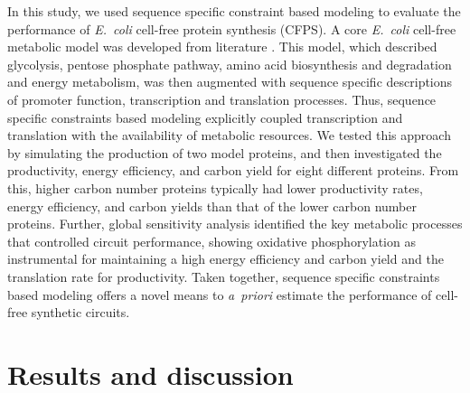 \documentclass[journal=asbcd6,manuscript=article]{achemso}
\begin{document}
In this study, we used sequence specific constraint based modeling to evaluate the performance of \emph{E.~coli} cell-free protein synthesis (CFPS).
A core \emph{E.~coli} cell-free metabolic model was developed from literature \cite{Feist:2007aa}.
This model, which described glycolysis, pentose phosphate pathway, amino acid biosynthesis and degradation and energy metabolism, was then augmented with
sequence specific descriptions of promoter function, transcription and translation processes.
Thus, sequence specific constraints based modeling explicitly coupled transcription and translation with the availability of metabolic resources.
We tested this approach by simulating the production of two model proteins, and then investigated the productivity, energy efficiency, and carbon yield for eight different proteins.
From this, higher carbon number proteins typically had lower productivity rates, energy efficiency, and carbon yields than that of the lower carbon number proteins.
Further, global sensitivity analysis identified the key metabolic processes that controlled circuit performance, showing oxidative phosphorylation as instrumental for maintaining a high energy efficiency and carbon yield and the translation rate for productivity.
Taken together, sequence specific constraints based modeling offers a novel means to \emph{a~priori} estimate the performance of cell-free synthetic circuits.

\clearpage

\section{Results and discussion}


\end{document}
